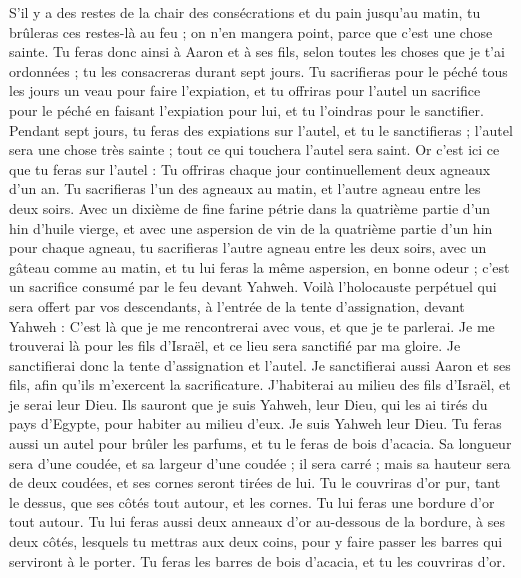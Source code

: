 \begin{multicols}{2}
S'il y a des restes de la chair des consécrations et du pain jusqu’au matin, tu brûleras ces restes-là au feu ; on n'en mangera point, parce que c'est une chose sainte.
Tu feras donc ainsi à Aaron et à ses fils, selon toutes les choses que je t'ai ordonnées ; tu les consacreras durant sept jours.
Tu sacrifieras pour le péché tous les jours un veau pour faire l’expiation, et tu offriras pour l'autel un sacrifice pour le péché en faisant l’expiation pour lui, et tu l'oindras pour le sanctifier.
Pendant sept jours, tu feras des expiations sur l'autel, et tu le sanctifieras ; l'autel sera une chose très sainte ; tout ce qui touchera l'autel sera saint.
Or c'est ici ce que tu feras sur l'autel : Tu offriras chaque jour continuellement deux agneaux d'un an.
Tu sacrifieras l'un des agneaux au matin, et l'autre agneau entre les deux soirs.
Avec un dixième de fine farine pétrie dans la quatrième partie d'un hin d’huile vierge, et avec une aspersion de vin de la quatrième partie d'un hin pour chaque agneau,
tu sacrifieras l'autre agneau entre les deux soirs, avec un gâteau comme au matin, et tu lui feras la même aspersion, en bonne odeur ; c'est un sacrifice consumé par le feu devant Yahweh.
Voilà l’holocauste perpétuel qui sera offert par vos descendants, à l’entrée de la tente d’assignation, devant Yahweh : C’est là que je me rencontrerai avec vous, et que je te parlerai.
Je me trouverai là pour les fils d'Israël, et ce lieu sera sanctifié par ma gloire.
Je sanctifierai donc la tente d'assignation et l'autel. Je sanctifierai aussi Aaron et ses fils, afin qu'ils m'exercent la sacrificature.
J'habiterai au milieu des fils d'Israël, et je serai leur Dieu.
Ils sauront que je suis Yahweh, leur Dieu, qui les ai tirés du pays d'Egypte, pour habiter au milieu d'eux. Je suis Yahweh leur Dieu.
\VerseOne{}Tu feras aussi un autel pour brûler les parfums, et tu le feras de bois d’acacia.
Sa longueur sera d'une coudée, et sa largeur d'une coudée ; il sera carré ; mais sa hauteur sera de deux coudées, et ses cornes seront tirées de lui.
Tu le couvriras d’or pur, tant le dessus, que ses côtés tout autour, et les cornes. Tu lui feras une bordure d’or tout autour.
Tu lui feras aussi deux anneaux d'or au-dessous de la bordure, à ses deux côtés, lesquels tu mettras aux deux coins, pour y faire passer les barres qui serviront à le porter.
Tu feras les barres de bois d’acacia, et tu les couvriras d'or.

\end{multicols}
